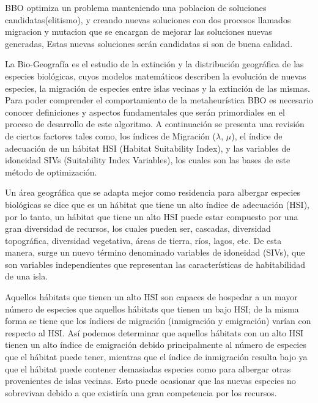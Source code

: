 \documentclass{article}
\begin{document}
BBO optimiza un problema manteniendo una poblacion de soluciones candidatas(elitismo), y creando nuevas soluciones con dos procesos
llamados migracion y mutacion que se encargan de mejorar las soluciones nuevas generadas, Estas nuevas soluciones serán candidatas si son
de buena calidad.\\
\vspace{3mm}

La Bio-Geografía es el estudio de la extinción y la distribución
geográfica de las especies biológicas, cuyos modelos matemáticos describen
la evolución de nuevas especies, la migración de especies entre islas
vecinas y la extinción de las mismas.
Para poder comprender el comportamiento de la metaheurística BBO
es necesario conocer definiciones y aspectos fundamentales que serán
primordiales en el proceso de desarrollo de este algoritmo. A continuación se
presenta una revisión de ciertos factores tales como, los índices de Migración
($\lambda$, $\mu$), el índice de adecuación de un hábitat HSI (Habitat Suitability Index), y
las variables de idoneidad SIVs (Suitability Index Variables), los cuales son
las bases de este método de optimización.\\
\vspace{3mm}

Un área geográfica que se adapta mejor como residencia para
albergar especies biológicas se dice que es un hábitat que tiene un alto
índice de adecuación (HSI), por lo tanto, un hábitat que tiene un alto HSI
puede estar compuesto por una gran diversidad de recursos, los cuales
pueden ser, cascadas, diversidad topográfica, diversidad vegetativa, áreas
de tierra, ríos, lagos, etc. De esta manera, surge un nuevo término
denominado variables de idoneidad (SIVs), que son variables independientes
que representan las características de habitabilidad de una isla.\\

\vspace{3mm}

Aquellos hábitats que tienen un alto HSI son capaces de hospedar a
un mayor número de especies que aquellos hábitats que tienen un bajo HSI;
de la misma forma se tiene que los índices de migración (inmigración y
emigración) varían con respecto al HSI. Así podemos determinar que
aquellos hábitats con un alto HSI tienen un alto índice de emigración debido
principalmente al número de especies que el hábitat puede tener, mientras
que el índice de inmigración resulta bajo ya que el hábitat puede contener
demasiadas especies como para albergar otras provenientes de islas
vecinas. Esto puede ocasionar que las nuevas especies no sobrevivan
debido a que existiría una gran competencia por los recursos.\\
\vspace{3mm}
\end{document}
